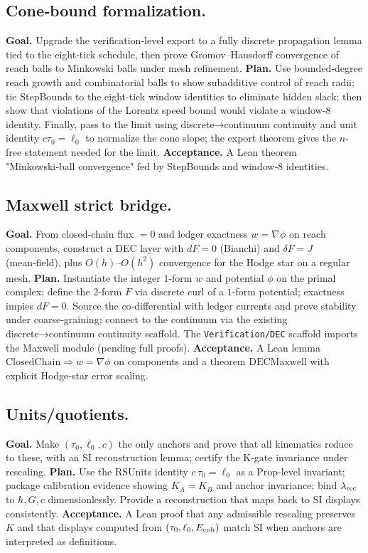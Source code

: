 \documentclass[12pt,a4paper]{article}
\theoremstyle{definition}
\theoremstyle{remark}
\begin{document}
\subsection{Cone‑bound formalization.}
\textbf{Goal.} Upgrade the verification‑level export to a fully discrete propagation lemma tied to the eight‑tick schedule, then prove Gromov–Hausdorff convergence of reach balls to Minkowski balls under mesh refinement.  
\textbf{Plan.} Use bounded‑degree reach growth and combinatorial balls to show subadditive control of reach radii; tie StepBounds to the eight‑tick window identities to eliminate hidden slack; then show that violations of the Lorentz speed bound would violate a window‑\(8\) identity. Finally, pass to the limit using discrete→continuum continuity and unit identity \(c\tau_0=\ell_0\) to normalize the cone slope; the export theorem gives the \(n\)-free statement needed for the limit.  
\textbf{Acceptance.} A Lean theorem "Minkowski‑ball convergence" fed by StepBounds and window‑\(8\) identities. 

\subsection{Maxwell strict bridge.}
\textbf{Goal.} From closed‑chain flux \(=0\) and ledger exactness \(w=\nabla\phi\) on reach components, construct a DEC layer with \(dF=0\) (Bianchi) and \(\delta F=J\) (mean‑field), plus \(O(h)\)–\(O(h^2)\) convergence for the Hodge star on a regular mesh.  
\textbf{Plan.} Instantiate the integer \(1\)-form \(w\) and potential \(\phi\) on the primal complex; define the \(2\)-form \(F\) via discrete curl of a \(1\)-form potential; exactness impies \(dF=0\). Source the co‑differential with ledger currents and prove stability under coarse‑graining; connect to the continuum via the existing discrete→continuum continuity scaffold. The \texttt{Verification/DEC} scaffold imports the Maxwell module (pending full proofs).  
\textbf{Acceptance.} A Lean lemma \(\mathrm{ClosedChain}\Rightarrow w=\nabla\phi\) on components and a theorem \(\mathrm{DECMaxwell}\) with explicit Hodge‑star error scaling.

\subsection{Units/quotients.}
\textbf{Goal.} Make \((\tau_0,\ell_0,c)\) the only anchors and prove that all kinematics reduce to these, with an SI reconstruction lemma; certify the K‑gate invariance under rescaling.  
\textbf{Plan.} Use the RSUnits identity \(c\,\tau_0=\ell_0\) as a Prop‑level invariant; package calibration evidence showing \(K_A=K_B\) and anchor invariance; bind \(\lambda_{\rm rec}\) to \(\hbar,G,c\) dimensionlessly. Provide a reconstruction that maps back to SI displays consistently.  
\textbf{Acceptance.} A Lean proof that any admissible rescaling preserves \(K\) and that displays computed from \((\tau_0,\ell_0,E_{\rm coh})\) match SI when anchors are interpreted as definitions.
\end{document}
